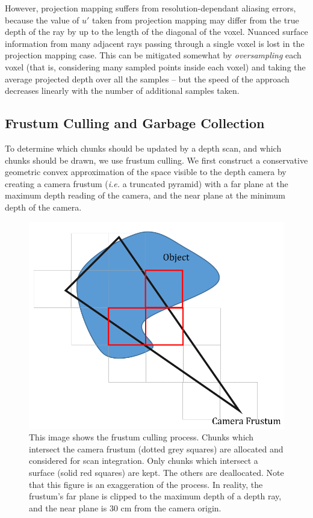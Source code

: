 \documentclass[conference,10pt]{IEEEtran}
\begin{document}
However, projection mapping suffers from resolution-dependant aliasing errors,
because the value of $u'$ taken from projection mapping may differ from the true
depth of the ray by up to the length of the diagonal of the voxel. Nuanced
surface information from many adjacent rays passing through a single voxel is
lost in the projection mapping case. This can be mitigated somewhat by
\textit{oversampling} each voxel (that is, considering many sampled points
inside each voxel) and taking the average projected depth over all the samples
-- but the speed of the approach decreases linearly with the number of
additional samples taken.

\subsection{Frustum Culling and Garbage Collection}
To determine which chunks should be updated by a depth scan, and which chunks
should be drawn, we use frustum culling. We first construct a conservative
geometric convex approximation of the space visible to the depth camera by
creating a camera frustum (\textit{i.e.} a truncated pyramid) with a far plane
at the maximum depth reading of the camera, and the near plane at the minimum
depth of the camera. 

\begin{figure}[t]
  \centering
    \includegraphics[width=1.0\columnwidth]{img/frustum_cull}
      \caption{This image shows the frustum culling process. Chunks which
      intersect the camera frustum (dotted grey squares) are allocated and
      considered for scan integration. Only chunks which intersect a surface
      (solid red squares) are kept. The others are deallocated. Note that this
      figure is an exaggeration of the process. In reality, the frustum's far
      plane is clipped to the maximum depth of a depth ray, and the near plane is 30 cm
      from the camera origin.}
  \label{fig:frustum_cull}
\end{figure}
\end{document}
